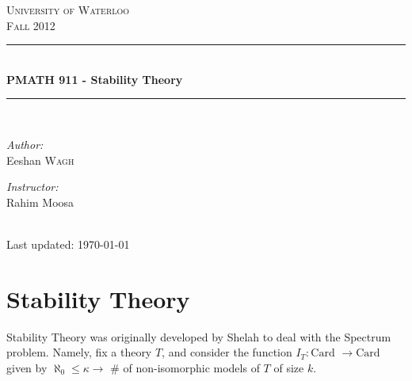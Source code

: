 \documentclass[letterpaper, 12pt]{article}
\theoremstyle{stdthm}
\theoremstyle{stddef}
\theoremstyle{stdnonum}
\theoremstyle{stdqands}
\theoremstyle{stdbold}
\begin{document}
\begin{titlepage}
\begin{center}
\textsc{\LARGE University of Waterloo}\\[1cm]
\textsc{\Large Fall 2012}\\[0.5cm]
\rule{\linewidth}{0.5mm} \\[0.4cm]
{\Large \bf PMATH 911 - Stability Theory}\\[0.2cm]
\rule{\linewidth}{0.5mm} \\[1cm]
\begin{minipage}{0.4\textwidth}
\begin{flushleft} \large
\emph{Author:}\\
Eeshan \textsc{Wagh}
\end{flushleft}
\end{minipage}
\begin{minipage}{0.4\textwidth}
\begin{flushright} \large
\emph{Instructor:} \\
Rahim Moosa
\end{flushright}
\end{minipage}
\\[1cm]
Last updated: \today \\
\end{center}

\tableofcontents

\end{titlepage}

\section{Stability Theory}
Stability Theory was originally developed by Shelah to deal with the Spectrum problem. Namely, fix a theory $T$, and consider the function $I_T: \text{Card } \to \text{Card}$ given by $\aleph_0 \leq \kappa \to $ \# of non-isomorphic models of $T$ of size $k$.
\end{document}
